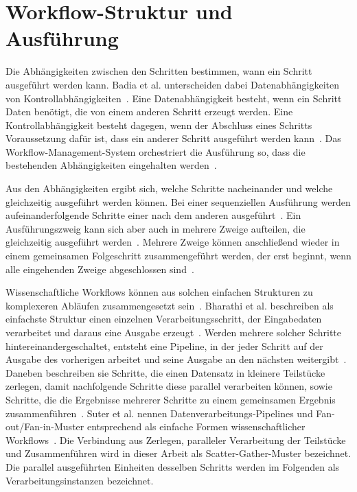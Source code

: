 \section{Workflow-Struktur und Ausführung}
\label{sec:basics:struktur}
Die Abhängigkeiten zwischen den Schritten bestimmen, wann ein
Schritt ausgeführt werden kann. Badia et al. unterscheiden dabei
Datenabhängigkeiten von
Kontrollabhängigkeiten~\cite[S.~28]{badia2017workflows}. Eine
Datenabhängigkeit besteht, wenn ein Schritt Daten benötigt, die
von einem anderen Schritt erzeugt werden. Eine
Kontrollabhängigkeit besteht dagegen, wenn der Abschluss eines
Schritts Voraussetzung dafür ist, dass ein anderer Schritt
ausgeführt werden kann~\cite[S.~259]{zhou2008control}. Das
Workflow-Management-System orchestriert die Ausführung so, dass die
bestehenden Abhängigkeiten eingehalten
werden~\cite[S.~4]{suter2026terminology}.
 
Aus den Abhängigkeiten ergibt sich, welche Schritte nacheinander und
welche gleichzeitig ausgeführt werden können. Bei einer sequenziellen Ausführung werden aufeinanderfolgende Schritte einer nach dem anderen
ausgeführt~\cite[S.~8]{russell2006patterns}.
Ein Ausführungszweig kann sich aber auch in mehrere Zweige
aufteilen, die gleichzeitig ausgeführt
werden~\cite[S.~9]{russell2006patterns}. Mehrere Zweige können anschließend wieder in einem gemeinsamen Folgeschritt zusammengeführt werden, der erst beginnt, wenn alle eingehenden Zweige abgeschlossen sind~\cite[S.~10]{russell2006patterns}.

Wissenschaftliche Workflows können aus solchen einfachen Strukturen
zu komplexeren Abläufen zusammengesetzt
sein~\cite[S.~2]{bharathi2008characterization}. Bharathi et al.
beschreiben als einfachste Struktur einen einzelnen
Verarbeitungsschritt, der Eingabedaten verarbeitet und daraus eine
Ausgabe erzeugt~\cite[S.~3]{bharathi2008characterization}. Werden mehrere solcher Schritte hintereinandergeschaltet, entsteht eine Pipeline, in der jeder Schritt auf der Ausgabe des vorherigen
arbeitet und seine Ausgabe an den nächsten weitergibt~\cite[S.~3]{bharathi2008characterization}.
Daneben beschreiben sie Schritte, die einen Datensatz in kleinere
Teilstücke zerlegen, damit nachfolgende Schritte diese parallel
verarbeiten können, sowie Schritte, die die Ergebnisse mehrerer
Schritte zu einem gemeinsamen Ergebnis
zusammenführen~\cite[S.~3]{bharathi2008characterization}. Suter et
al. nennen Datenverarbeitungs-Pipelines und Fan-out/Fan-in-Muster
entsprechend als einfache Formen wissenschaftlicher
Workflows~\cite[S.~4]{suter2026terminology}. Die Verbindung aus
Zerlegen, paralleler Verarbeitung der Teilstücke und Zusammenführen
wird in dieser Arbeit als Scatter-Gather-Muster bezeichnet. Die
parallel ausgeführten Einheiten desselben Schritts werden im
Folgenden als Verarbeitungsinstanzen bezeichnet.



